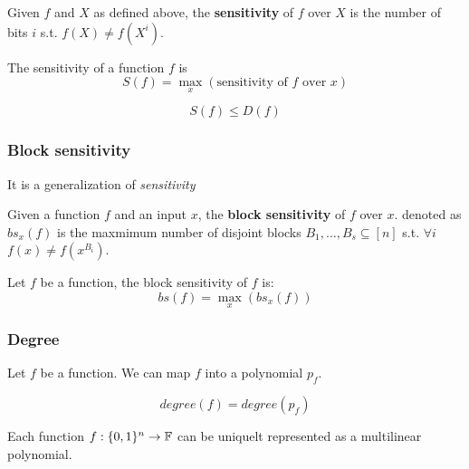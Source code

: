         Given $f$ and $X$ as defined above, the \textbf{sensitivity} of $f$ over $X$ is the number of bits $i$ s.t. $f(X) \neq f(X^i)$.

        \begin{definition}[Sensitivity]\label{def:sensitivity}
            The sensitivity of a function $f$ is
            \[ S(f) = \max_x( \text{sensitivity of } f \text{ over } x ) \]
        \end{definition}

        \[ S(f) \leq D(f) \]


    \subsubsection{Block sensitivity}\label{subsubsec:block_sensitivity}
        It is a generalization of \textit{sensitivity}

        Given a function $f$ and an input $x$, the \textbf{block sensitivity} of $f$ over $x$. denoted as $bs_x(f)$ is the maxmimum number of disjoint blocks $B_1, \dots, B_s \subseteq [n]$ s.t. $\forall i$ $f(x) \neq f(x^{B_i})$.

        \begin{definition}\label{def:block_sensitivity}
            Let $f$ be a function, the block sensitivity of $f$ is:
            \[ bs(f) = \max_x( bs_x(f) ) \]
        \end{definition}

    \subsubsection{Degree}\label{subsubsec:degree}

        \begin{definition}[Degree]\label{def:degree_func}
            Let $f$ be a function.
            We can map $f$ into a polynomial $p_f$.

            \[ degree(f) = degree(p_f) \]
        \end{definition}

        Each function $f : \{ 0,1 \}^n \rightarrow \mathbb{F}$ can be uniquelt represented as a multilinear polynomial.